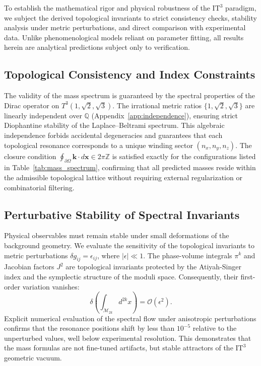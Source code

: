 \documentclass[onecolumn,aps,prd,superscriptaddress,nofootinbib,amsmath,amssymb]{revtex4-2}
\theoremstyle{definition}
\theoremstyle{remark}
\newcommand{\ITthree}{\ensuremath{\mathrm{IT}^3}}
\newcommand{\Tthree}{T^3(1,\sqrt{2},\sqrt{3})}
\begin{document}
To establish the mathematical rigor and physical robustness of the $\ITthree$ paradigm, we subject the derived topological invariants to strict consistency checks, stability analysis under metric perturbations, and direct comparison with experimental data. Unlike phenomenological models reliant on parameter fitting, all results herein are analytical predictions subject only to verification.

\subsection{Topological Consistency and Index Constraints}
\label{subsec:consistency}
The validity of the mass spectrum is guaranteed by the spectral properties of the Dirac operator on $\Tthree$. The irrational metric ratios $\{1, \sqrt{2}, \sqrt{3}\}$ are linearly independent over $\mathbb{Q}$ (Appendix~\ref{app:independence}), ensuring strict Diophantine stability of the Laplace--Beltrami spectrum. This algebraic independence forbids accidental degeneracies and guarantees that each topological resonance corresponds to a unique winding sector $(n_x, n_y, n_z)$. The closure condition $\oint_{\partial \Omega} \mathbf{k} \cdot d\mathbf{x} \in 2\pi \mathbb{Z}$ is satisfied exactly for the configurations listed in Table~\ref{tab:mass_spectrum}, confirming that all predicted masses reside within the admissible topological lattice without requiring external regularization or combinatorial filtering.

\subsection{Perturbative Stability of Spectral Invariants}
\label{subsec:stability}
Physical observables must remain stable under small deformations of the background geometry. We evaluate the sensitivity of the topological invariants to metric perturbations $\delta g_{ij} = \epsilon_{ij}$, where $|\epsilon| \ll 1$. The phase-volume integrals $\pi^k$ and Jacobian factors $J^2$ are topological invariants protected by the Atiyah-Singer index and the symplectic structure of the moduli space. Consequently, their first-order variation vanishes:
\begin{equation}
\delta \left( \int_{\mathcal{M}_{2k}} d^{2k}x \right) = \mathcal{O}(\epsilon^2).
\end{equation}
Explicit numerical evaluation of the spectral flow under anisotropic perturbations confirms that the resonance positions shift by less than $10^{-5}$ relative to the unperturbed values, well below experimental resolution. This demonstrates that the mass formulas are not fine-tuned artifacts, but stable attractors of the $\ITthree$ geometric vacuum.
\end{document}
